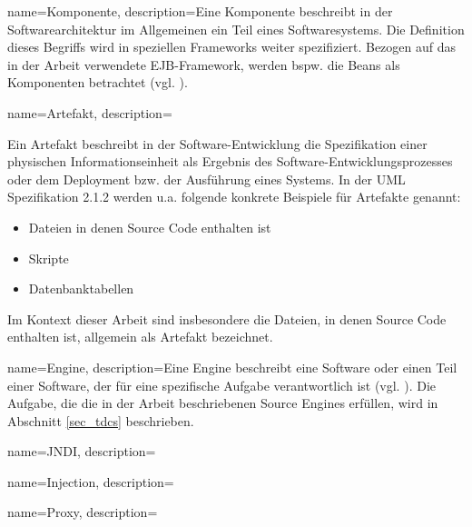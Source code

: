 

{
    name=Komponente,
    description={Eine Komponente beschreibt in der Softwarearchitektur im Allgemeinen ein Teil eines Softwaresystems. Die Definition dieses Begriffs wird in speziellen Frameworks weiter spezifiziert. Bezogen auf das in der Arbeit verwendete EJB-Framework, werden bspw. die Beans als Komponenten betrachtet (vgl. \cite{ejbspec}).
}
}
{
    name=Artefakt,
    description={Ein Artefakt beschreibt in der Software-Entwicklung die Spezifikation einer physischen Informationseinheit als Ergebnis des Software-Entwicklungsprozesses oder dem Deployment bzw. der Ausführung eines Systems. In der UML Spezifikation 2.1.2 \cite{uml} werden u.a. folgende konkrete Beispiele für Artefakte genannt:
    \begin{itemize}
    \item Dateien in denen Source Code enthalten ist
    \item Skripte
    \item Datenbanktabellen    
    \end{itemize}
    \noindent
    Im Kontext dieser Arbeit sind insbesondere die Dateien, in denen Source Code enthalten ist, allgemein als Artefakt bezeichnet.
}
}


{
    name=Engine,
    description={Eine Engine beschreibt eine Software oder einen Teil einer Software, der für eine spezifische Aufgabe verantwortlich ist (vgl. \cite{pcmag}). Die Aufgabe, die die in der Arbeit beschriebenen Source Engines erfüllen, wird in Abschnitt \ref{sec_tdcs} beschrieben.}
}

{
    name=JNDI,
    description={}
}


{
    name=Injection,
    description={}
}


{
    name=Proxy,
    description={}
}